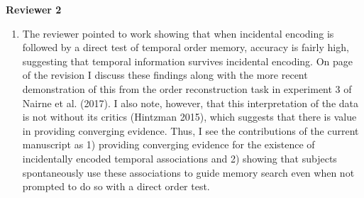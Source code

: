\documentclass[12pt]{article}
\begin{document}
\vspace{20pt}

\textbf{\large{Reviewer 2}}

\begin{enumerate}

	\item 
	The reviewer pointed to work showing that when incidental encoding is followed by a direct test of temporal order memory, accuracy is fairly high, suggesting that temporal information survives incidental encoding. On page \pageref{TODO-8} of the revision I discuss these findings along with the more recent demonstration of this from the order reconstruction task in experiment 3 of Nairne et al. (2017). I also note, however, that this interpretation of the data is not without its critics (Hintzman 2015), which suggests that there is value in providing converging evidence. Thus, I see the contributions of the current manuscript as 1) providing converging evidence for the existence of incidentally encoded temporal associations and 2) showing that subjects spontaneously use these associations to guide memory search even when not prompted to do so with a direct order test. 


\end{enumerate}
\end{document}
